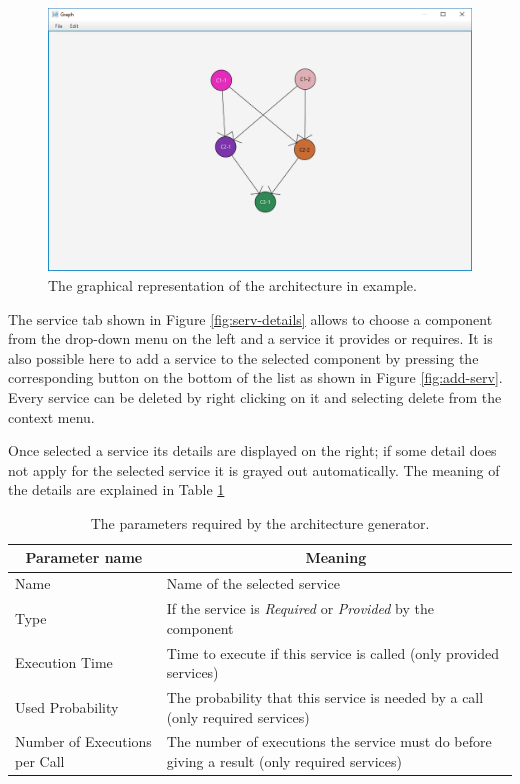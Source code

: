 \begin{figure}[!h]
	\centerline
	{\includegraphics[scale=0.50]{img/view_arch.png}}
	\caption[Architecture graphical representation]{The graphical representation of the architecture in example.}
	\label{fig:view-arch}
\end{figure}

The service tab shown in Figure \ref{fig:serv-details} allows to choose a component from the drop-down menu on the left and a service it provides or requires. It is also possible here to add a service to the selected component by pressing the corresponding button on the bottom of the list as shown in Figure \ref{fig:add-serv}. Every service can be deleted by right clicking on it and selecting delete from the context menu.

Once selected a service its details are displayed on the right; if some detail does not apply for the selected service it is grayed out automatically. The meaning of the details are explained in Table \ref{tab:serv-details}

\begin{table}[ht!b]
	\centering
	\begin{tabular}{|p{}|p{9cm}|}
		\hline
		\multicolumn{1}{|c|}{Parameter name} & \multicolumn{1}{c|}{Meaning} \\
		\hline 
		Name & Name of the selected service \\
		\hline
		Type & If the service is \emph{Required} or \emph{Provided} by the component \\
		\hline
		Execution Time & Time to execute if this service is called (only provided services)\\
		\hline
		Used Probability & The probability that this service is needed by a call (only required services)\\
		\hline
		Number of Executions per Call & The number of executions the service must do before giving a result (only required services) \\
		\hline
		
	\end{tabular} 
	\caption[Generator parameters]{The parameters required by the architecture generator.}
	\label{tab:serv-details}
\end{table}


